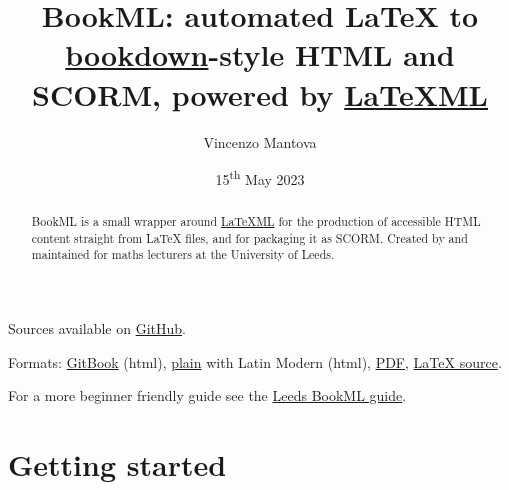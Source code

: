 \documentclass[a4paper,british]{article}
\title{BookML\@: automated LaTeX to \href{https://bookdown.org/yihui/bookdown/html.html\#gitbook-style}{bookdown}-style HTML and SCORM, powered by \href{https://dlmf.nist.gov/LaTeXML/}{LaTeXML}}
\author{Vincenzo Mantova}
\date{15\textsuperscript{th} May 2023}
\begin{document}
\maketitle

\begin{abstract}
  BookML is a small wrapper around \href{https://dlmf.nist.gov/LaTeXML/}{LaTeXML} for the production of accessible HTML content straight from LaTeX files, and for packaging it as SCORM\@. Created by and maintained for maths lecturers at the University of Leeds.
\end{abstract}

\begin{center}
  Sources available on \href{https://github.com/vlmantova/bookml/}{GitHub}.

  Formats: \href{https://vlmantova.github.io/bookml/}{GitBook} (html), \href{https://vlmantova.github.io/bookml/index.plain.html}{plain} with Latin Modern (html), \href{https://vlmantova.github.io/bookml/docs.pdf}{PDF}, \href{https://github.com/vlmantova/bookml/blob/docs/docs.tex}{\LaTeX{} source}.

  For a more beginner friendly guide see the \href{https://vlmantova.github.io/bookmlleeds/}{Leeds BookML guide}.
\end{center}

\tableofcontents

\section{Getting started}
\end{document}
